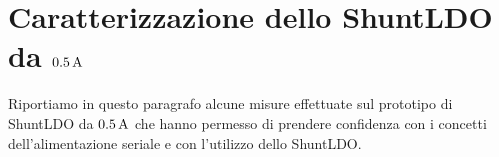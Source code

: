 
%


\section{Caratterizzazione dello ShuntLDO da $0.5\rm \, A$}

Riportiamo in questo paragrafo alcune misure effettuate sul prototipo di ShuntLDO da $0.5\rm \, A$ che hanno permesso di prendere confidenza con i concetti dell'alimentazione seriale e con l'utilizzo dello ShuntLDO.

